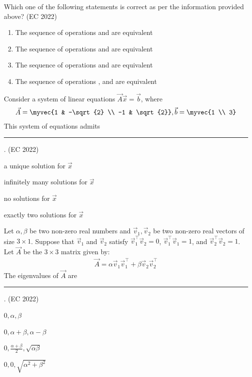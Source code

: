     Which one of the following statements is correct as per the information provided above?
    \hfill{(EC 2022)}
    \begin{enumerate}
        \item The sequence of operations  and  are equivalent
        \item The sequence of operations  and  are equivalent
        \item The sequence of operations  and  are equivalent
        \item The sequence of operations ,  and  are equivalent
    \end{enumerate}
    \item Consider a system of linear equations $\vec{A}\vec{x} = \vec{b}$, where
    \begin{align*}
	    \vec{A} = \myvec{1 & -\sqrt{2} \\ -1 & \sqrt{2}},  \vec{b} = \myvec{1 \\ 3}
    \end{align*}
    This system of equations admits \rule{2cm}{0.4pt}.
    \hfill{(EC 2022)}
    \begin{enumerate}
    \begin{multicols}{2}
        \item a unique solution for $\vec{x}$
        \item infinitely many solutions for $\vec{x}$
        \item no solutions for $\vec{x}$
        \item exactly two solutions for $\vec{x}$
        \end{multicols}
    \end{enumerate}
    \item Let $\alpha, \beta$ be two non-zero real numbers and $\vec{v}_1, \vec{v}_2$ be two non-zero real vectors of size $3 \times 1$. Suppose that $\vec{v}_1$ and $\vec{v}_2$ satisfy $\vec{v}_1^{\top} \vec{v}_2 = 0$, $\vec{v}_1^{\top} \vec{v}_1 = 1$, and $\vec{v}_2^{\top} \vec{v}_2 = 1$. Let $\vec{A}$ be the $3 \times 3$ matrix given by:
    \begin{align*}
     \vec{A} = \alpha \vec{v}_1 \vec{v}_1^{\top} + \beta \vec{v}_2 \vec{v}_2^{\top} 
     \end{align*}
    The eigenvalues of $\vec{A}$ are \rule{2cm}{0.4pt}.
    \hfill{(EC 2022)}
    \begin{enumerate}
    \begin{multicols}{4}
        \item $0, \alpha, \beta$
        \item $0, \alpha+\beta, \alpha-\beta$
        \item $0, \frac{\alpha+\beta}{2}, \sqrt{\alpha\beta}$
        \item $0, 0, \sqrt{\alpha^2+\beta^2}$
        \end{multicols}
    \end{enumerate}
